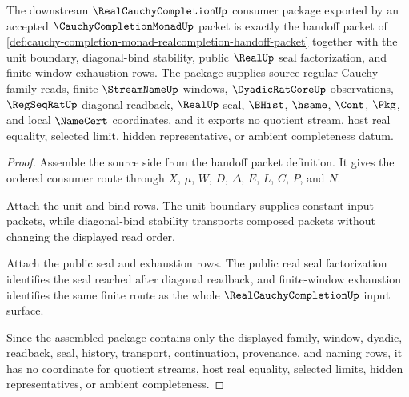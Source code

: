 \begin{theorem}
\label{thm:cauchy-completion-monad-realcompletion-consumer-package}
The downstream $\RealCauchyCompletionUp$ consumer package exported by an accepted $\CauchyCompletionMonadUp$ packet is exactly the handoff packet of \autoref{def:cauchy-completion-monad-realcompletion-handoff-packet} together with the unit boundary, diagonal-bind stability, public $\RealUp$ seal factorization, and finite-window exhaustion rows. The package supplies source regular-Cauchy family reads, finite $\StreamNameUp$ windows, $\DyadicRatCoreUp$ observations, $\RegSeqRatUp$ diagonal readback, $\RealUp$ seal, $\BHist$, $\hsame$, $\Cont$, $\Pkg$, and local $\NameCert$ coordinates, and it exports no quotient stream, host real equality, selected limit, hidden representative, or ambient completeness datum.
\end{theorem}
\begin{proof}
Assemble the source side from the handoff packet definition. It gives the ordered consumer route through $X$, $\mu$, $W$, $D$, $\Delta$, $E$, $L$, $C$, $P$, and $N$.

Attach the unit and bind rows. The unit boundary supplies constant input packets, while diagonal-bind stability transports composed packets without changing the displayed read order.

Attach the public seal and exhaustion rows. The public real seal factorization identifies the seal reached after diagonal readback, and finite-window exhaustion identifies the same finite route as the whole $\RealCauchyCompletionUp$ input surface.

Since the assembled package contains only the displayed family, window, dyadic, readback, seal, history, transport, continuation, provenance, and naming rows, it has no coordinate for quotient streams, host real equality, selected limits, hidden representatives, or ambient completeness.
\end{proof}


